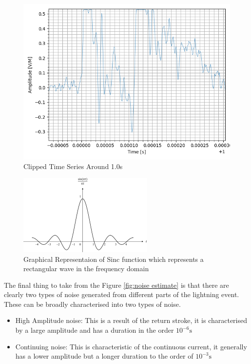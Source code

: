 \begin{figure}[h!]
    \centering
    \includegraphics[width = \textwidth]{figs/sig_character/Clipping.png}
    \caption{Clipped Time Series Around 1.0s}
    \label{fig:clipping}
\end{figure}

\begin{figure}[h!]
    \centering
    \includegraphics[width = 0.6\textwidth]{figs/sig_character/sinc.jpg}
    \caption{Graphical Representaion of Sinc function which represents a rectangular wave in the frequency domain}
    \label{fig:sinc}
\end{figure}

The final thing to take from the Figure \ref{fig:noise estimate} is that there are clearly two types of noise generated from different parts of the lightning event. These can be broadly characterised into two types of noise.
\begin{itemize}
    \item High Amplitude noise: This is a result of the return stroke, it is characterised by a large amplitude and has a duration in the order $10^{-6}\si{\second}$ 
    \item Continuing noise: This is characteristic of the continuous current, it generally has a lower amplitude but a longer duration to the order of $10^{-3}\si{\second}$
\end{itemize}





